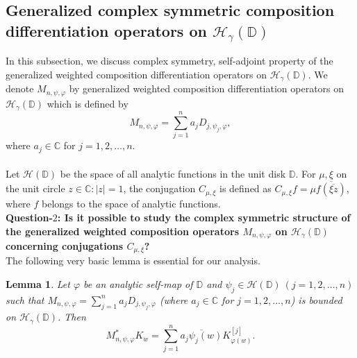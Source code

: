 \documentclass[12pt, reqno]{amsart}
\newtheorem{lemma}[theorem]{Lemma}
\theoremstyle{definition}
\theoremstyle{remark}
\numberwithin{equation}{section}
\begin{document}
\subsection{ Generalized complex symmetric composition differentiation operators on $\mathcal{H}_\gamma(\mathbb{D})$}
In this subsection, we discuss complex symmetry, self-adjoint property of the generalized weighted composition differentiation operators on $\mathcal{H}_\gamma(\mathbb{D})$.
We denote $M_{n, \psi, \varphi}$ by generalized weighted composition differentiation  operators on $\mathcal{H}_\gamma(\mathbb{D})$ which is defined by 
$$M_{n, \psi, \varphi}=\displaystyle\sum_{j=1}^{n}a_jD_{j,\psi_j, \varphi},$$
where $a_j\in \mathbb{C}$ for $j=1, 2, \dots, n$.
\\ \\
Let $\mathcal{H}(\mathbb{D})$ be the space of all analytic functions in the unit disk $\mathbb{D}$.
For $\mu, \xi$ on the unit circle $z\in \mathbb{C}: |z|=1$, the conjugation $C_{\mu, \xi}$ is defined as $C_{\mu, \xi}f=\mu \overline{f(\overline{\xi z})}$, where $f$ belongs to the space of analytic functions. \\
{\bf Question-$2$: Is it possible to study the complex symmetric structure of the generalized weighted composition operators $M_{n, \psi, \varphi}$ on $\mathcal{H}_\gamma(\mathbb{D})$ concerning conjugations $C_{\mu, \xi}$?}\\


The following very basic lemma is essential for our analysis.
\begin{lemma}
 Let $\varphi$ be an analytic self-map of $\mathbb{D}$ and $\psi_j\in \mathcal{H}(\mathbb{D})~(j=1, 2,\dots, n)$ such that $M_{n, \psi, \varphi}=\displaystyle\sum_{j=1}^{n}a_jD_{j,\psi_j, \varphi} $ (where $a_j\in \mathbb{C}$ for $j=1, 2, \dots, n$) is bounded on $\mathcal{H}_\gamma(\mathbb{D})$.
  	Then 
  	$$ M_{n,\psi, \varphi}^*K_w=\sum_{j=1}^{n}\overline{a_j\psi_j(w)}K_{\varphi(w)}^{[j]}.$$
\end{lemma}
\end{document}
